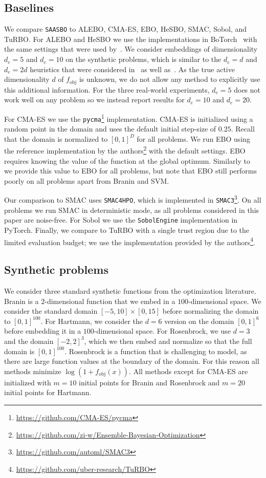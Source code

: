 \documentclass[accepted]{uai2021} %
\newcommand{\fobj}{f_{\text{obj}}}
\newcommand{\algoname}{{\texttt {SAASBO}}}
\begin{document}
\subsection{Baselines}
We compare \algoname{} to ALEBO, CMA-ES, EBO, HeSBO, SMAC, Sobol, and TuRBO.
For ALEBO and HeSBO we use the implementations in BoTorch~\citep{balandat2020botorch} with the same settings that were
used by~\citep{letham2020re}.
We consider embeddings of dimensionality $d_e=5$ and $d_e=10$ on the synthetic problems, which is similar to the $d_e = d$ and $d_e = 2 d$ heuristics that were considered in~\citep{nayebi2019framework} as well as~\citep{letham2020re}.
As the true active dimensionality $d$ of $\fobj$ is unknown, we do not allow any method to explicitly use this additional information.
For the three real-world experiments, $d_e=5$ does not work well on any problem so we instead
report results for $d_e=10$ and $d_e=20$.

For CMA-ES we use the \texttt{pycma}\footnote{\url{https://github.com/CMA-ES/pycma}} implementation.
CMA-ES is initialized using a random point in the domain and uses the default initial step-size of $0.25$.
Recall that the domain is normalized to $[0, 1]^D$ for all problems.
We run EBO using the reference implementation by the authors\footnote{\url{https://github.com/zi-w/Ensemble-Bayesian-Optimization}} with the default settings.
EBO requires knowing the value of the function at the global optimum.
Similarly to~\citep{letham2020re} we provide this value to EBO for all problems, but note that EBO still performs poorly on all problems apart from Branin and SVM.

Our comparison to SMAC uses \texttt{SMAC4HPO}, which is implemented in \texttt{SMAC3}\footnote{\url{https://github.com/automl/SMAC3}}.
On all problems we run SMAC in deterministic mode, as all problems considered in this paper are noise-free.
For Sobol we use the \texttt{SobolEngine} implementation in PyTorch.
Finally, we compare to TuRBO with a single trust region due to the limited evaluation budget; we use the implementation provided by the authors\footnote{\url{https://github.com/uber-research/TuRBO}}.


\subsection{Synthetic problems}
We consider three standard synthetic functions from the optimization literature.
Branin is a $2$-dimensional function that we embed in a $100$-dimensional space.
We consider the standard domain $[-5, 10] \times [0, 15]$ before normalizing the
domain to $[0, 1]^{100}$.
For Hartmann, we consider the $d=6$ version on the domain $[0, 1]^6$ before embedding it in a $100$-dimensional space.
For Rosenbrock, we use $d=3$ and the domain $[-2, 2]^3$, which we then embed and normalize so that the full domain is $[0, 1]^{100}$.
Rosenbrock is a function that is challenging to model, as there are large function values at the boundary of the domain.
For this reason all methods minimize ${\log(1 + \fobj(x))}$.
All methods except for CMA-ES are initialized with $m=10$ initial points for Branin and Rosenbrock and
$m=20$ initial points for Hartmann.
\end{document}
